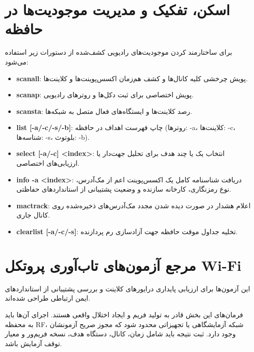 \documentclass[11pt,a4paper]{article}
\newcommand{\lr}[1]{\foreignlanguage{english}{#1}}
\newcommand{\en}[1]{\lr{#1}}
\begin{document}
\section{اسکن، تفکیک و مدیریت موجودیت‌ها در حافظه}
برای ساختارمند کردن موجودیت‌های رادیویی کشف‌شده از دستورات زیر استفاده می‌شود:
\begin{itemize}
    \item \lr{\textbf{scanall}:} پویش چرخشی کلیه کانال‌ها و کشف هم‌زمان اکسس‌پوینت‌ها و کلاینت‌ها.
    \item \lr{\textbf{scanap}:} پویش اختصاصی برای ثبت دکل‌ها و روترهای رادیویی.
    \item \lr{\textbf{scansta}:} رصد کلاینت‌ها و ایستگاه‌های فعال متصل به شبکه‌ها.
    \item \lr{\textbf{list [-a/-c/-s/-b]}:} چاپ فهرست اهداف در حافظه (روترها: \lr{-a}، کلاینت‌ها: \lr{-c}، شناسه‌ها: \lr{-s}، بلوتوث: \lr{-b}).
    \item \lr{\textbf{select [-a/-c] <index>}:} انتخاب یک یا چند هدف برای تحلیل جهت‌دار یا ارزیابی‌های اختصاصی.
    \item \lr{\textbf{info -a <index>}:} دریافت شناسنامه کامل یک اکسس‌پوینت اعم از مک‌آدرس، نوع رمزنگاری، کارخانه سازنده و وضعیت پشتیبانی از استانداردهای حفاظتی.
    \item \lr{\textbf{mactrack}:} اعلام هشدار در صورت دیده شدن مجدد مک‌آدرس‌های ذخیره‌شده روی کانال جاری.
    \item \lr{\textbf{clearlist [-a/-c/-s]}:} تخلیه جداول موقت حافظه جهت آزادسازی رم پردازنده.
\end{itemize}

\newpage
\section{مرجع آزمون‌های تاب‌آوری پروتکل \en{Wi-Fi}}
این آزمون‌ها برای ارزیابی پایداری درایورهای کلاینت و بررسی پشتیبانی از استانداردهای ایمن ارتباطی طراحی شده‌اند.

\begin{tcolorbox}[colback=yellow!8,colframe=orange!65!black,arc=2mm,title={دامنه مجاز آزمایش}]
فرمان‌های این بخش قادر به تولید فریم و ایجاد اختلال واقعی هستند. اجرای آن‌ها باید به محفظه \en{RF}، شبکه آزمایشگاهی یا تجهیزاتی محدود شود که مجوز صریح آزمونشان وجود دارد. ثبت نتیجه باید شامل زمان، کانال، دستگاه هدف، نسخه فریم‌ور و معیار توقف آزمایش باشد.
\end{tcolorbox}
\end{document}
